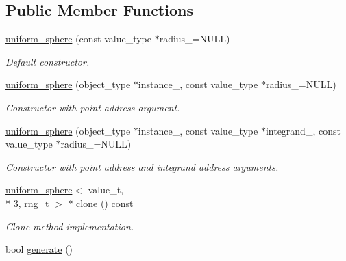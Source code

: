 \subsection*{Public Member Functions}
\begin{DoxyCompactItemize}
\item 
\hypertarget{a00552_a2c09af09b24c57806b2fcbb49a8dd9f3}{\hyperlink{a00552_a2c09af09b24c57806b2fcbb49a8dd9f3}{uniform\-\_\-sphere} (const value\-\_\-type $\ast$radius\-\_\-=N\-U\-L\-L)}\label{a00552_a2c09af09b24c57806b2fcbb49a8dd9f3}

\begin{DoxyCompactList}\small\item\em Default constructor. \end{DoxyCompactList}\item 
\hypertarget{a00552_aa09f20feb57237830be8cf20c70333b4}{\hyperlink{a00552_aa09f20feb57237830be8cf20c70333b4}{uniform\-\_\-sphere} (object\-\_\-type $\ast$instance\-\_\-, const value\-\_\-type $\ast$radius\-\_\-=N\-U\-L\-L)}\label{a00552_aa09f20feb57237830be8cf20c70333b4}

\begin{DoxyCompactList}\small\item\em Constructor with point address argument. \end{DoxyCompactList}\item 
\hypertarget{a00552_a7099e721f8dde908a9ddde5981d56691}{\hyperlink{a00552_a7099e721f8dde908a9ddde5981d56691}{uniform\-\_\-sphere} (object\-\_\-type $\ast$instance\-\_\-, const value\-\_\-type $\ast$integrand\-\_\-, const value\-\_\-type $\ast$radius\-\_\-=N\-U\-L\-L)}\label{a00552_a7099e721f8dde908a9ddde5981d56691}

\begin{DoxyCompactList}\small\item\em Constructor with point address and integrand address arguments. \end{DoxyCompactList}\item 
\hypertarget{a00552_aa5d713607492dad2c5f1bb30c86c5458}{\hyperlink{a00549}{uniform\-\_\-sphere}$<$ value\-\_\-t, \\*
3, rng\-\_\-t $>$ $\ast$ \hyperlink{a00552_aa5d713607492dad2c5f1bb30c86c5458}{clone} () const }\label{a00552_aa5d713607492dad2c5f1bb30c86c5458}

\begin{DoxyCompactList}\small\item\em Clone method implementation. \end{DoxyCompactList}\item 
\hypertarget{a00552_a2d1d9de11dbd1832c6c3349b10547b27}{bool \hyperlink{a00552_a2d1d9de11dbd1832c6c3349b10547b27}{generate} ()}\label{a00552_a2d1d9de11dbd1832c6c3349b10547b27}


\end{DoxyCompactItemize}
